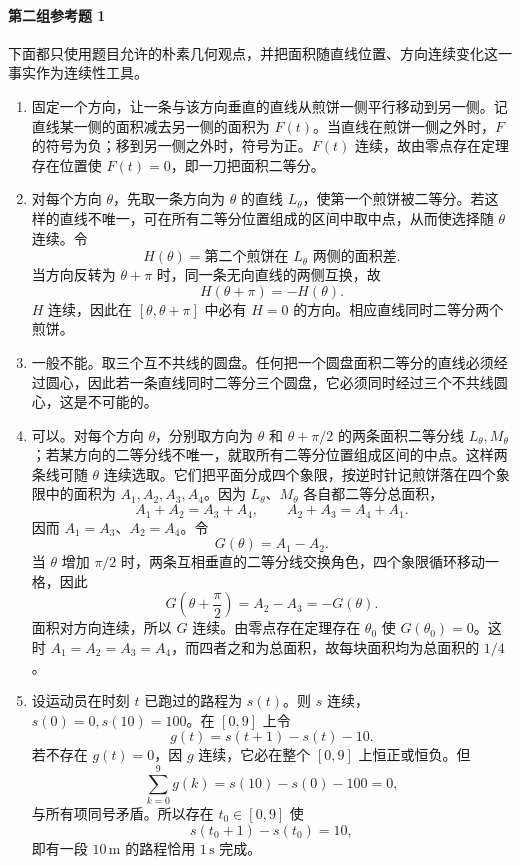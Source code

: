 \paragraph{第二组参考题 1}
\begin{xsolution}
下面都只使用题目允许的朴素几何观点，并把面积随直线位置、方向连续变化这一事实作为连续性工具。

\begin{enumerate}[label=(\arabic*)]
 \item 固定一个方向，让一条与该方向垂直的直线从煎饼一侧平行移动到另一侧。记直线某一侧的面积减去另一侧的面积为 $F(t)$。当直线在煎饼一侧之外时，$F$ 的符号为负；移到另一侧之外时，符号为正。$F(t)$ 连续，故由零点存在定理存在位置使 $F(t)=0$，即一刀把面积二等分。

 \item 对每个方向 $\theta$，先取一条方向为 $\theta$ 的直线 $L_\theta$，使第一个煎饼被二等分。若这样的直线不唯一，可在所有二等分位置组成的区间中取中点，从而使选择随 $\theta$ 连续。令
 \[
  H(\theta)=\text{第二个煎饼在 }L_\theta\text{ 两侧的面积差}.
 \]
 当方向反转为 $\theta+\pi$ 时，同一条无向直线的两侧互换，故
 \[
  H(\theta+\pi)=-H(\theta).
 \]
 $H$ 连续，因此在 $[\theta,\theta+\pi]$ 中必有 $H=0$ 的方向。相应直线同时二等分两个煎饼。

 \item 一般不能。取三个互不共线的圆盘。任何把一个圆盘面积二等分的直线必须经过圆心，因此若一条直线同时二等分三个圆盘，它必须同时经过三个不共线圆心，这是不可能的。

 \item 可以。对每个方向 $\theta$，分别取方向为 $\theta$ 和 $\theta+\pi/2$ 的两条面积二等分线 $L_\theta,M_\theta$；若某方向的二等分线不唯一，就取所有二等分位置组成区间的中点。这样两条线可随 $\theta$ 连续选取。它们把平面分成四个象限，按逆时针记煎饼落在四个象限中的面积为 $A_1,A_2,A_3,A_4$。因为 $L_\theta$、$M_\theta$ 各自都二等分总面积，
 \[
  A_1+A_2=A_3+A_4,
  \qquad
  A_2+A_3=A_4+A_1.
 \]
 因而 $A_1=A_3$、$A_2=A_4$。令
 \[
  G(\theta)=A_1-A_2.
 \]
 当 $\theta$ 增加 $\pi/2$ 时，两条互相垂直的二等分线交换角色，四个象限循环移动一格，因此
 \[
  G\left(\theta+\frac\pi2\right)=A_2-A_3=-G(\theta).
 \]
 面积对方向连续，所以 $G$ 连续。由零点存在定理存在 $\theta_0$ 使 $G(\theta_0)=0$。这时 $A_1=A_2=A_3=A_4$，而四者之和为总面积，故每块面积均为总面积的 $1/4$。

 \item 设运动员在时刻 $t$ 已跑过的路程为 $s(t)$。则 $s$ 连续，$s(0)=0,s(10)=100$。在 $[0,9]$ 上令
 \[
  g(t)=s(t+1)-s(t)-10.
 \]
 若不存在 $g(t)=0$，因 $g$ 连续，它必在整个 $[0,9]$ 上恒正或恒负。但
 \[
  \sum_{k=0}^{9}g(k)
  =s(10)-s(0)-100=0,
 \]
 与所有项同号矛盾。所以存在 $t_0\in[0,9]$ 使
 \[
  s(t_0+1)-s(t_0)=10,
 \]
 即有一段 $10\,\mathrm m$ 的路程恰用 $1\,\mathrm s$ 完成。


\end{enumerate}
\end{xsolution}
